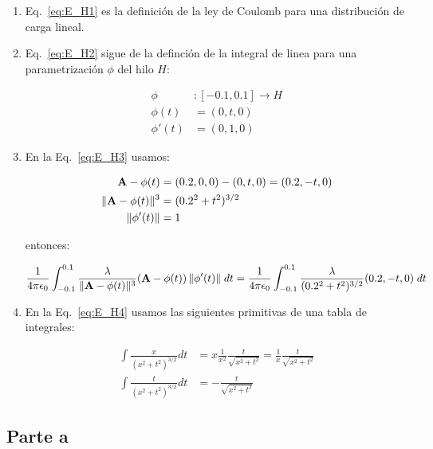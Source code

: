 \documentclass[12pt]{article}
\DeclarePairedDelimiter{\norm}{\Vert}{\Vert}
\begin{document}
\begin{enumerate}

    \item Eq.~\ref{eq:E_H1} es la definición de la ley de Coulomb para una
        distribución de carga lineal.

    \item Eq.~\ref{eq:E_H2} sigue de la definción de la integral de linea para
        una parametrización $\phi$ del hilo $H$:

        \begin{align*}
            \phi&:[-0.1,0.1]\rightarrow H\\
            \phi(t)&=(0,t,0)\\
            \phi'(t)&=(0,1,0)
        \end{align*}

    \item En la Eq.~\ref{eq:E_H3} usamos:

        \begin{align*}
            \mathbf{A}-\phi(t)&=(0.2,0,0)-(0,t,0)=(0.2,-t,0)\\
            \norm{\mathbf{A}-\phi(t)}^3&=(0.2^2+t^2)^{3/2}\\
            \norm{\phi'(t)}&=1
        \end{align*}

        entonces:

        \begin{align*}
            \frac{1}{4\pi\epsilon_0}\int_{-0.1}^{0.1}\frac{\lambda}{\norm{\mathbf{A}-\phi(t)}^3}(\mathbf{A}-\phi(t))\,\norm{\phi'(t)}\;dt=\frac{1}{4\pi\epsilon_0}\int_{-0.1}^{0.1}\frac{\lambda}{(0.2^2+t^2)^{3/2}}(0.2,-t,0)\;dt
        \end{align*}

    \item En la Eq.~\ref{eq:E_H4} usamos las siguientes primitivas de una
        tabla de integrales:

        \begin{align*}
            \int\frac{x}{(x^2+t^2)^{3/2}}dt&=x\frac{1}{x^2}\frac{t}{\sqrt{x^2+t^2}}=\frac{1}{x}\frac{t}{\sqrt{x^2+t^2}}\\
            \int\frac{t}{(x^2+t^2)^{3/2}}dt&=-\frac{t}{\sqrt{x^2+t^2}}
        \end{align*}

\end{enumerate}
\subsection*{Parte a}
\end{document}
